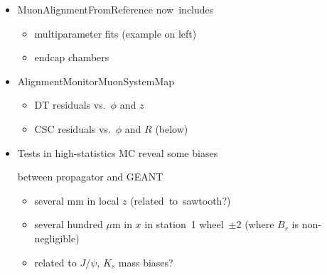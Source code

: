 \documentclass[compress]{beamer}
\begin{document}
\begin{frame}
\begin{columns}
\begin{itemize}\setlength{\itemsep}{-0.05 cm}
\item MuonAlignmentFromReference \mbox{now includes\hspace{-1 cm}}

\vspace{-0.2 cm}
\begin{itemize}
\item \scriptsize multiparameter fits (example on left)
\item \scriptsize endcap chambers
\end{itemize}

\item AlignmentMonitorMuonSystemMap

\vspace{-0.2 cm}
\begin{itemize}
\item \scriptsize DT residuals vs.\ $\phi$ and $z$
\item \scriptsize CSC residuals vs.\ $\phi$ and $R$ (below)
\end{itemize}

\item Tests in high-statistics MC reveal some biases

\vspace{-0.08 cm}
between propagator and GEANT

\vspace{-0.2 cm}
\begin{itemize}
\item \scriptsize several mm in local $z$ \mbox{(related to sawtooth?)\hspace{-1 cm}}
\item \scriptsize several hundred $\mu$m in $x$ in station~1 wheel~$\pm$2 (where $B_r$ is non-negligible)
\item \scriptsize related to $J/\psi$, $K_s$ mass biases?
\end{itemize}
\end{itemize}


\end{columns}
\end{frame}
\end{document}
